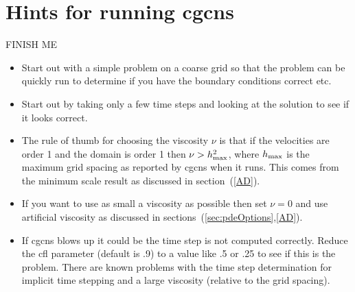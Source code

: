 \documentclass{article}
\newcommand{\Index}[1]{#1\index{#1}}
\begin{document}












\section{Hints for running cgcns}

FINISH ME

\begin{itemize}
  \item Start out with a simple problem on a coarse grid so that the problem
      can be quickly run to determine if you have the boundary conditions correct etc.
  \item Start out by taking only a few time steps and looking at the solution to
      see if it looks correct.
  \item The rule of thumb for choosing the viscosity $\nu$ is that if the velocities
    are order 1 and the domain is order 1 then $\nu > h_{\rm max}^2$, where 
    $h_{\rm max}$ is the maximum grid spacing as reported by cgcns when it runs.
    This comes from the minimum scale result as discussed in section~(\ref{AD}).
  \item If you want to use as small a viscosity as possible then set $\nu=0$
    and use \Index{artificial viscosity} as discussed in sections~(\ref{sec:pdeOptions},\ref{AD}).
  \item If cgcns blows up it could be the time step is not computed correctly. Reduce
   the cfl parameter (default is .9) to a value like .5 or .25 to see if this is the problem.
   There are known problems with the time step determination for implicit time stepping and
   a large viscosity (relative to the grid spacing).
\end{itemize}
\end{document}
